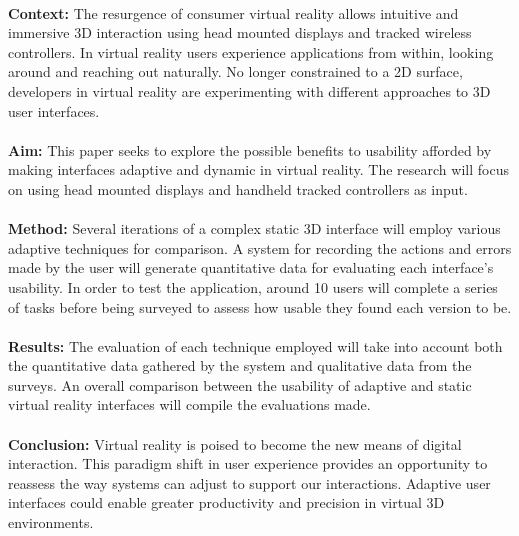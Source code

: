 \documentclass[11pt]{article}
\begin{document}
\paragraph{}
\textbf{Context:}
The resurgence of consumer virtual reality allows intuitive and immersive 3D interaction using head mounted displays and tracked wireless controllers. In virtual reality users experience applications from within, looking around and reaching out naturally. No longer constrained to a 2D surface, developers in virtual reality are experimenting with different approaches to 3D user interfaces.
\paragraph{}
\textbf{Aim:}
This paper seeks to explore the possible benefits to usability afforded by making interfaces adaptive and dynamic in virtual reality. The research will focus on using head mounted displays and handheld tracked controllers as input.
\paragraph{}
\textbf{Method:}
Several iterations of a complex static 3D interface will employ various adaptive techniques for comparison. A system for recording the actions and errors made by the user will generate quantitative data for evaluating each interface's usability. In order to test the application, around 10 users will complete a series of tasks before being surveyed to assess how usable they found each version to be.
\paragraph{}
\textbf{Results:}
The evaluation of each technique employed will take into account both the quantitative data gathered by the system and qualitative data from the surveys. An overall comparison between the usability of adaptive and static virtual reality interfaces will compile the evaluations made.
\paragraph{}
\textbf{Conclusion:}
Virtual reality is poised to become the new means of digital interaction. This paradigm shift in user experience provides an opportunity to reassess the way systems can adjust to support our interactions. Adaptive user interfaces could enable greater productivity and precision in virtual 3D environments.
\end{document}
